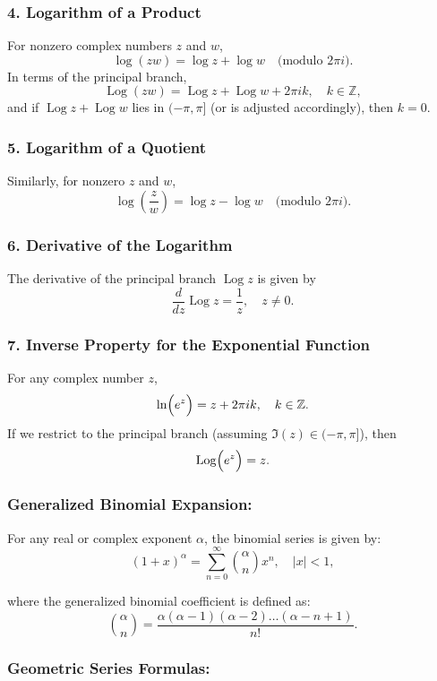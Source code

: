 \documentclass[12pt]{article}
\DeclareMathOperator{\Log}{Log}
\theoremstyle{definition} %
\theoremstyle{plain} %
\begin{document}
\subsubsection*{4. Logarithm of a Product}
For nonzero complex numbers \(z\) and \(w\),
\[
\log(zw) = \log z + \log w \quad \text{(modulo }2\pi i\text{)}.
\]
In terms of the principal branch,
\[
\Log(zw) = \Log z + \Log w + 2\pi i k, \quad k\in\mathbb{Z},
\]
and if \(\Log z + \Log w\) lies in \((-\pi, \pi]\) (or is adjusted accordingly), then \(k=0\).

\subsubsection*{5. Logarithm of a Quotient}
Similarly, for nonzero \(z\) and \(w\),
\[
\log\left(\frac{z}{w}\right) = \log z - \log w \quad \text{(modulo }2\pi i\text{)}.
\]

\subsubsection*{6. Derivative of the Logarithm}
The derivative of the principal branch \(\Log z\) is given by
\[
\frac{d}{dz}\Log z = \frac{1}{z}, \quad z\neq 0.
\]

\subsubsection*{7. Inverse Property for the Exponential Function}
For any complex number \(z\),
\[
\ln\Bigl(e^z\Bigr) = z + 2\pi i k, \quad k\in\mathbb{Z}.
\]
If we restrict to the principal branch (assuming \(\Im(z) \in (-\pi,\pi]\)), then
\[
\Log\Bigl(e^z\Bigr) = z.
\]
\subsubsection*{Generalized Binomial Expansion:}

For any real or complex exponent \(\alpha\), the binomial series is given by:
\[
(1 + x)^\alpha = \sum_{n=0}^{\infty} \binom{\alpha}{n} x^n, \quad |x| < 1,
\]

where the generalized binomial coefficient is defined as:
\[
\binom{\alpha}{n} = \frac{\alpha(\alpha - 1)(\alpha - 2)\dots(\alpha - n + 1)}{n!}.
\]

\subsubsection*{Geometric Series Formulas:}
\end{document}
